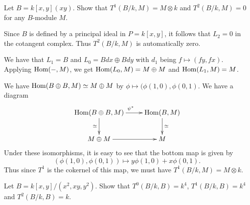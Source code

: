 \documentclass[11pt, english]{article}
\begin{document}
\begin{exc}[Exercise 3.1]
Let $B=k[x,y](xy)$. Show that $T^1(B/k,M)=M \otimes k$ and $T^2(B/k,M)=0$ for any $B$-module $M$.  
\end{exc}
\begin{sol}
Since $B$ is defined by a principal ideal in $P=k[x,y]$, it follows that $L_2=0$ in the cotangent complex. Thus $T^2(B/k,M)$ is automatically zero.

We have that $L_1 = B$ and $L_0 = B dx \oplus B dy$ with $d_1$ being $f \mapsto (fy,fx)$. Applying $\operatorname{Hom}(-,M)$, we get $\operatorname{Hom}(L_0,M)=M \oplus M$ and $\operatorname{Hom}(L_1,M)=M$.

We have $\operatorname{Hom}(B \oplus B,M) \simeq M \oplus M$ by $\phi \mapsto (\phi(1,0),\phi(0,1)$. We have a diagram
\[
\xymatrix{
\Hom(B \oplus B, M) \ar[d]_{\simeq} \ar[r]^{\psi^\ast} & \Hom(B,M) \ar[d]^{\simeq} \\
M \oplus M  \ar[r] & M
}
\]
Under these isomorphisms, it is easy to see that the bottom map is given by
\[
(\phi(1,0),\phi(0,1)) \mapsto y \phi(1,0) + x\phi(0,1).
\]
Thus since $T^1$ is the cokernel of this map, we must have $T^1(B/k,M) = M \otimes k$. 
\end{sol}

\begin{exc}[Exercise 3.3]
Let $B = k[x,y]/(x^2,xy,y^2)$. Show that $T^0(B/k,B) = k^4$, $T^1(B/k,B)=k^4$ and $T^2(B/k,B)=k$.  
\end{exc}
\end{document}
